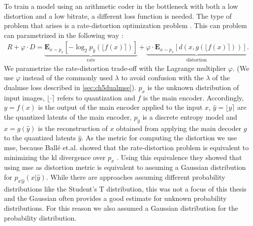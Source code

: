 To train a model using an arithmetic coder in the bottleneck with both a low distortion and a low bitrate, a different loss function is needed. The type of problem that arises is a rate-distortion optimization problem \citep{balle_variational_2018}. This can problem can parametrized in the following way \citep{minnen_joint_2018}:
\begin{align}
R + \varphi \cdot D = \underbrace{\mathbf{E}_{x\sim p_x} [ -\log_2 p_{\hat{y}}(\lfloor f(x)\rceil)]}_\text{rate}+ \underbrace{\varphi \cdot\mathbf{E}_{x\sim p_x} [d(x,g(\lfloor f(x)\rceil))]}_\text{distortion}.
\end{align}
We parametrize the rate-distortion trade-off with the Lagrange multiplier $\varphi$. (We use $\varphi$ instead of the commonly used $\lambda$ to avoid confusion with the $\lambda$ of the \ac{dualmse} loss described in \autoref{sec:ch5dualmse}). $p_x$ is the unknown distribution of input images, $\lfloor\cdot\rceil$ refers to quantization and $f$ is the main encoder. Accordingly, $y=f(x)$ is the output of the main encoder applied to the input $x$, $\hat{y} = \lfloor y\rceil$ are the quantized latents of the main encoder, $p_{\hat{y}}$ is a discrete entropy model and $\hat{x}=g(\hat{y})$ is the reconstruction of $x$ obtained from applying the main decoder $g$ to the quantized latents $\hat{y}$. As the metric for computing the distortion we use \ac{mse}, because Ballé et.al. showed that the rate-distortion problem is equivalent to minimizing the \ac{kl} divergence over $p_x$ \citep{balle_variational_2018}. Using this equivalence they showed that using \ac{mse} as distortion metric is equivalent to assuming a Gaussian distribution for $p_{x|\hat{y}}(x|\hat{y})$. While there are approaches assuming different probability distributions like the Student's T distribution, this was not a focus of this thesis and the Gaussian often provides a good estimate for unknown probability distributions. For this reason we also assumed a Gaussian distribution for the probability distribution.

